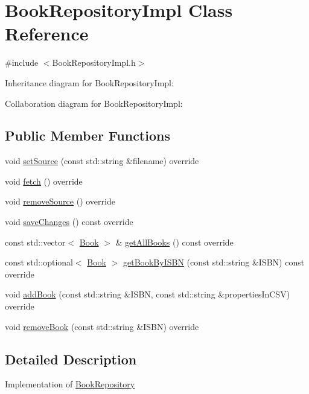 \hypertarget{classBookRepositoryImpl}{}\section{Book\+Repository\+Impl Class Reference}
\label{classBookRepositoryImpl}


{\ttfamily \#include $<$Book\+Repository\+Impl.\+h$>$}



Inheritance diagram for Book\+Repository\+Impl\+:


Collaboration diagram for Book\+Repository\+Impl\+:
\subsection*{Public Member Functions}
\begin{DoxyCompactItemize}
\item 
void \hyperlink{classBookRepositoryImpl_aea4f6c50587d26ba6bf4bbfd41001dfd}{set\+Source} (const std\+::string \&filename) override
\item 
void \hyperlink{classBookRepositoryImpl_aec9b4797e9153c1088c7e4a6659124be}{fetch} () override
\item 
void \hyperlink{classBookRepositoryImpl_a1550bae55aa379da68b4391bcc0648eb}{remove\+Source} () override
\item 
void \hyperlink{classBookRepositoryImpl_a1c28f61a8981b52aa45ca1b11ef0e099}{save\+Changes} () const override
\item 
const std\+::vector$<$ \hyperlink{classBook}{Book} $>$ \& \hyperlink{classBookRepositoryImpl_aa3603924efed4ec623235193d2350569}{get\+All\+Books} () const override
\item 
const std\+::optional$<$ \hyperlink{classBook}{Book} $>$ \hyperlink{classBookRepositoryImpl_ab41594acd9ec505c0eaa048fa1ae2c19}{get\+Book\+By\+I\+S\+BN} (const std\+::string \&I\+S\+BN) const override
\item 
void \hyperlink{classBookRepositoryImpl_a8b9d7df06f6ab11efd72cb32cbfb52fe}{add\+Book} (const std\+::string \&I\+S\+BN, const std\+::string \&properties\+In\+C\+SV) override
\item 
void \hyperlink{classBookRepositoryImpl_aefed48951263bb21153b24fd7bcf0e1c}{remove\+Book} (const std\+::string \&I\+S\+BN) override
\end{DoxyCompactItemize}


\subsection{Detailed Description}
Implementation of \hyperlink{classBookRepository}{Book\+Repository} 

